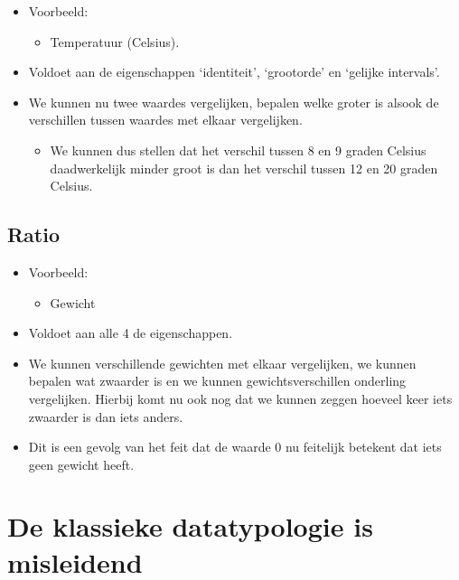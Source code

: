 \documentclass[]{memoir}
\providecommand{\tightlist}{%
  \setlength{\itemsep}{0pt}\setlength{\parskip}{0pt}}
\begin{document}
\begin{itemize}
\tightlist
\item
  Voorbeeld:

  \begin{itemize}
  \tightlist
  \item
    Temperatuur (Celsius).
  \end{itemize}
\item
  Voldoet aan de eigenschappen `identiteit', `grootorde' en `gelijke intervals'.
\item
  We kunnen nu twee waardes vergelijken, bepalen welke groter is alsook de verschillen tussen waardes met elkaar vergelijken.

  \begin{itemize}
  \tightlist
  \item
    We kunnen dus stellen dat het verschil tussen 8 en 9 graden Celsius daadwerkelijk minder groot is dan het verschil tussen 12 en 20 graden Celsius.
  \end{itemize}
\end{itemize}

\hypertarget{ratio}{%
\subsection*{Ratio}\label{ratio}}

\begin{itemize}
\tightlist
\item
  Voorbeeld:

  \begin{itemize}
  \tightlist
  \item
    Gewicht
  \end{itemize}
\item
  Voldoet aan alle 4 de eigenschappen.
\item
  We kunnen verschillende gewichten met elkaar vergelijken, we kunnen bepalen wat zwaarder is en we kunnen gewichtsverschillen onderling vergelijken. Hierbij komt nu ook nog dat we kunnen zeggen hoeveel keer iets zwaarder is dan iets anders.
\item
  Dit is een gevolg van het feit dat de waarde 0 nu feitelijk betekent dat iets geen gewicht heeft.
\end{itemize}

\hypertarget{de-klassieke-datatypologie-is-misleidend}{%
\section{De klassieke datatypologie is misleidend}\label{de-klassieke-datatypologie-is-misleidend}}
\end{document}
